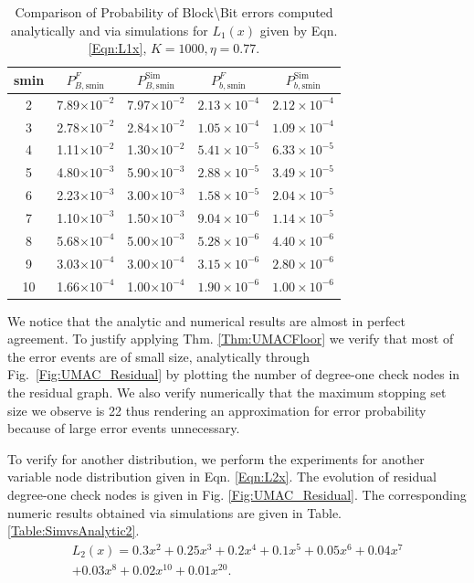 \begin{table}[!ht]
\centering
\begin{tabular}{c c c c c}
\hline  \hline
smin & $P_{B,\text{smin}}^F$ & $P_{B,\text{smin}}^{\text{Sim}}$ & $P_{b,\text{smin}}^F$ & $P_{b,\text{smin}}^{\text{Sim}}$ \\
\hline
2 & 7.89$\times 10^{-2}$  &  7.97$\times 10^{-2}$ &$2.13\times 10^{-4}$&$2.12\times 10^{-4}$\\
3 & 2.78$\times 10^{-2}$  & 2.84$\times 10^{-2}$&$1.05\times 10^{-4}$&$1.09\times 10^{-4}$ \\
4 & 1.11$\times 10^{-2}$  &1.30$\times 10^{-2}$ &$5.41\times 10^{-5}$&$6.33\times 10^{-5}$\\
5 & 4.80$\times 10^{-3}$  &5.90$\times 10^{-3}$& $2.88\times 10^{-5}$&$3.49\times 10^{-5}$\\
6 & 2.23$\times 10^{-3}$  &3.00$\times 10^{-3}$ &$1.58\times 10^{-5}$&$2.04\times 10^{-5}$\\
7 & 1.10$\times 10^{-3}$  &1.50$\times 10^{-3}$ &$9.04\times 10^{-6}$&$1.14\times 10^{-5}$\\
8 &5.68$\times 10^{-4}$   &5.00$\times 10^{-3}$&$5.28\times 10^{-6}$&$4.40\times 10^{-6}$\\
9 & 3.03$\times 10^{-4}$  &3.00$\times 10^{-4}$ & $3.15\times 10^{-6}$&$2.80\times 10^{-6}$\\
10 & 1.66$\times 10^{-4}$ &1.00$\times 10^{-4}$&$1.90\times 10^{-6}$&$1.00\times 10^{-6}$\\
\end{tabular}
\caption{Comparison of Probability of Block\textbackslash Bit errors computed analytically and via simulations for $L_1(x)$ given by Eqn. \eqref{Eqn:L1x}, $K=1000, \eta=0.77$.}
\label{Table:SimvsAnalytic1}
\end{table}

\begin{remark}
We notice that the analytic and numerical results are almost in perfect agreement. To justify applying Thm. \ref{Thm:UMACFloor} we verify that most of the error events are of small size, analytically through Fig.~\ref{Fig:UMAC_Residual} by plotting the number of degree-one check nodes in the residual graph. We also verify numerically that the maximum stopping set size we observe is 22 thus rendering an approximation for error probability because of large error events unnecessary. 
\end{remark}

To verify for another distribution, we perform the experiments for another variable node distribution given in Eqn. \eqref{Eqn:L2x}. The evolution of residual degree-one check nodes is given in Fig. \ref{Fig:UMAC_Residual}. The corresponding numeric results obtained via simulations are given in Table. \ref{Table:SimvsAnalytic2}.
\begin{multline}
L_{2}(x)=0.3x^2+ 0.25 x^3+ 0.2 x^4 + 0.1 x^5+ 0.05 x^{6} + 0.04 x^{7}\\
 + 0.03 x^{8} + 0.02 x^{10}+ 0.01 x^{20}.
\label{Eqn:L2x}
\end{multline}

